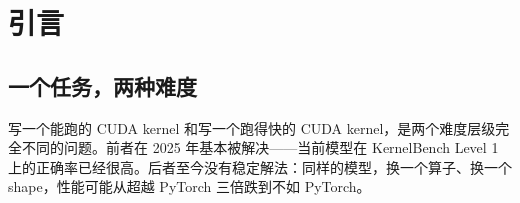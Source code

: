 

\begin{abstract}

把 kernel 生成交给强化学习，在直觉上几乎是必然的选择：奖励天然可验证——能不能编译、能不能通过正确性检查、比基线快多少，都能用机器判定，不需要人工偏好标注。2025 年 7 月到 2026 年 10 月，这条路线产出了十余个工作，速度声明的量级从个位数百分比一路走到数十个百分点。

本文对这批工作做系统梳理，发现真实的技术进展集中在一个地方：\textbf{奖励怎么设计}。而算法本身几乎没有变化——13 个核心工作中，没有一个提出新的优化目标，绝大多数直接使用 GRPO，或在 GRPO 上打补丁。

这个判断带来一个不太乐观的推论。GRPO 有两个已知缺陷：组内自包含（self-inclusion）导致策略梯度有偏；依赖终端结果评估，在长程任务上奖励天然稀疏。kernel 生成恰好同时具备这两个触发条件——一次优化需要多轮编译与测速，而奖励本身可分解为正确性与速度两部分。

于是我们看到的演进，本质上是\textbf{在算法不变的前提下，用奖励工程去补这两个洞}：层次化奖励分解、渐进式奖励、基于 profiling 的拒绝采样、结构化代码奖励、上下文压实。这些手段都有效，但都是在绕开问题，而不是解决问题。

本文的贡献有三点。第一，把 13 个核心工作的奖励设计拆成可比较的维度，给出演进脉络。第二，指出这批工作中被反复报告却未被系统处理的奖励作弊机制，并说明它不是实现 bug，而是奖励结构的必然结果。第三，指出这些工作的消融做对了因果、却量错了指标：它们证明中间奖励提高了通过率，但没有回答它是否提高了端到端加速比。据此给出的具体建议见第 7 节（报告平凡基线、报告绝对加速比）。

另有一处方法论记录。本文初稿仅凭摘要断言「无人报告中间奖励的净效果」，读全文后发现该断言错误。我们把错误的发生方式写在第 6.1 节——当证据源比研究对象窄时，缺失会被误读为不存在。这比结论本身更值得记住。

\vspace{4pt}\noindent\textbf{关键词：}CUDA kernel 生成；强化学习；可验证奖励；奖励作弊；GRPO

\end{abstract}
\section{引言}

\subsection{一个任务，两种难度}

写一个能跑的 CUDA kernel 和写一个跑得快的 CUDA kernel，是两个难度层级完全不同的问题。前者在 2025 年基本被解决——当前模型在 KernelBench Level 1 上的正确率已经很高。后者至今没有稳定解法：同样的模型，换一个算子、换一个 shape，性能可能从超越 PyTorch 三倍跌到不如 PyTorch。

